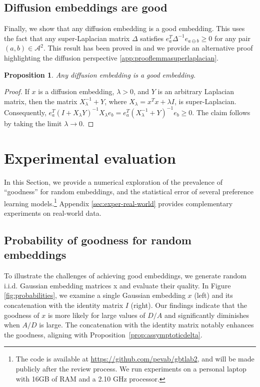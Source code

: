 \documentclass{article}
\newtheorem{proposition}{Proposition}
\newcommand{\cA}{\mathcal A}
\newcommand{\ab}{a\ominus{} b}
\begin{document}
\subsection{Diffusion embeddings are good}

Finally, we show that any diffusion embedding is a good embedding. 
This uses the fact that any super-Laplacian matrix $\Delta$ satisfies
$e_a^T \Delta^{-1} e_{\ab{}} \ge 0$ for any pair $(a, b)\in\cA^2$.
This result has been proved in \cite[Lemma 1]{DBLP:conf/aaai/FageotFHV24} and we provide an alternative proof highlighting the diffusion perspective \ref{app:prooflemmasuperlaplacian}.



\begin{proposition}
    \label{prop:diffusion-is-good}
    Any diffusion embedding is a good embedding.
\end{proposition}

\begin{proof}
    If $x$ is a diffusion embedding, $\lambda > 0$, and $Y$ is an arbitrary Laplacian matrix, then the matrix $X_\lambda^{-1} + Y$,
    where $X_\lambda = x^Tx + \lambda I$, is super-Laplacian.
    Consequently,
    $e_a^T(I + X_\lambda Y)^{-1}X_\lambda e_b = e_a^T(X_\lambda^{-1} + Y)^{-1}e_b \ge 0$.
    The claim follows by taking the limit $\lambda \to 0$.
\end{proof}


\section{Experimental evaluation}
\label{sec:experiments}

In this Section, we provide a numerical exploration of the prevalence of ``goodness'' for random embeddings, and the statistical error of several preference learning models.\footnote{The code is available at \url{https://github.com/pevab/gbtlab2}, and will be made publicly after the review process. We run experiments on a personal laptop with 16GB of RAM and a 2.10 GHz processor.}
Appendix \ref{sec:exper-real-world} provides complementary experiments on real-world data.

\subsection{Probability of goodness for random embeddings}
\label{sec:probagood}
To illustrate the challenges of achieving good embeddings, we generate random i.i.d. Gaussian embedding matrices x and evaluate their quality. In Figure \ref{fig:probabilities}, we examine a single Gaussian embedding $x$ (left) and its concatenation with the identity matrix $I$ (right). Our findings indicate that the goodness of $x$ is  more likely for large values of $D/A$ and significantly diminishes when $A/D$ is large. The concatenation with the identity matrix notably enhances the goodness, aligning with Proposition~\ref{prop:assymptoticdelta}.
\end{document}

